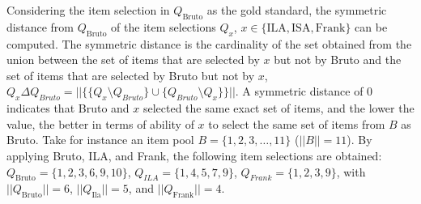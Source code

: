 \documentclass[12pt, a4paper, titilepage]{article}
\begin{document}
Considering the item selection in $Q_{\text{Bruto}}$ as the gold standard, the symmetric distance from $Q_{\text{Bruto}}$ of the item selections $Q_x$, $x \in \{\text{ILA}, \text{ISA}, \text{Frank}\}$ can be computed.  
The symmetric distance is the cardinality of the set obtained from the union between the set of items that are selected by $x$ but not by Bruto and the set of items that are selected by Bruto but not by $x$, 
$Q_x \Delta Q_{Bruto} = ||\{ \{Q_x \setminus Q_{Bruto}\} \cup \{Q_{Bruto} \setminus Q_{x}\} \}||$. A symmetric distance of 0 indicates that Bruto and $x$ selected the same exact set of items, and the lower the value, the better in terms of ability of $x$ to select the same set of items from $B$ as Bruto. 
Take for instance an item pool $B = \{1,2,3,\ldots,11\}$ ($||B|| = 11$). 
By applying Bruto, ILA, and Frank, the following item selections are obtained:  $Q_{\text{Bruto}} = \{1,2,3,6,9, 10\}$, $Q_{ILA} = \{1,4,5,7,9\}$, $Q_{Frank} = \{1,2,3,9\}$, with $||Q_{\text{Bruto}}|| = 6$, $||Q_{\text{Ila}}|| = 5$, and $||Q_{\text{Frank}}|| = 4$.  
% 
\end{document}
